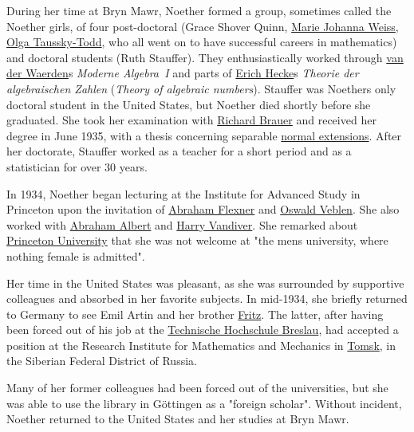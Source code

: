 During her time at Bryn Mawr, Noether formed a group, sometimes called the Noether girls, of four post-doctoral (Grace Shover Quinn, \href{https://en.wikipedia.org/wiki/Marie_Johanna_Weiss}{Marie Johanna Weiss}, \href{https://en.wikipedia.org/wiki/Olga_Taussky-Todd}{Olga Taussky-Todd}, who all went on to have successful careers in mathematics) and doctoral students (Ruth Stauffer). They enthusiastically worked through \href{https://en.wikipedia.org/wiki/Van_der_Waerden}{van der Waerden}\textquotesingle s \emph{Moderne Algebra{~}I} and parts of \href{https://en.wikipedia.org/wiki/Erich_Hecke}{Erich Hecke}\textquotesingle s \emph{Theorie der algebraischen Zahlen} (\emph{Theory of algebraic numbers}). Stauffer was Noether\textquotesingle s only doctoral student in the United States, but Noether died shortly before she graduated. She took her examination with \href{https://en.wikipedia.org/wiki/Richard_Brauer}{Richard Brauer} and received her degree in June 1935, with a thesis concerning separable \href{https://en.wikipedia.org/wiki/Normal_extension}{normal extensions}. After her doctorate, Stauffer worked as a teacher for a short period and as a statistician for over 30 years.

In 1934, Noether began lecturing at the Institute for Advanced Study in Princeton upon the invitation of \href{https://en.wikipedia.org/wiki/Abraham_Flexner}{Abraham Flexner} and \href{https://en.wikipedia.org/wiki/Oswald_Veblen}{Oswald Veblen}. She also worked with \href{https://en.wikipedia.org/wiki/Abraham_Albert}{Abraham Albert} and \href{https://en.wikipedia.org/wiki/Harry_Vandiver}{Harry Vandiver}. She remarked about \href{https://en.wikipedia.org/wiki/Princeton_University}{Princeton University} that she was not welcome at "the men\textquotesingle s university, where nothing female is admitted".

Her time in the United States was pleasant, as she was surrounded by supportive colleagues and absorbed in her favorite subjects. In mid-1934, she briefly returned to Germany to see Emil Artin and her brother \href{https://en.wikipedia.org/wiki/Fritz_Noether}{Fritz}. The latter, after having been forced out of his job at the \href{https://en.wikipedia.org/wiki/Technische_Hochschule_Breslau}{Technische Hochschule Breslau}, had accepted a position at the Research Institute for Mathematics and Mechanics in \href{https://en.wikipedia.org/wiki/Tomsk}{Tomsk}, in the Siberian Federal District of Russia.

Many of her former colleagues had been forced out of the universities, but she was able to use the library in Göttingen as a "foreign scholar". Without incident, Noether returned to the United States and her studies at Bryn Mawr.


